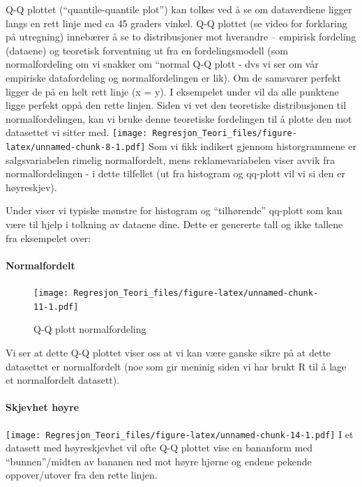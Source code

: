 \documentclass[
]{article}
\begin{document}
Q-Q plottet (``quantile-quantile plot'') kan tolkes ved å se om
dataverdiene ligger langs en rett linje med ca 45 graders vinkel. Q-Q
plottet (se video for forklaring på utregning) innebærer å se to
distribusjoner mot hverandre -- empirisk fordeling (dataene) og
teoretisk forventning ut fra en fordelingsmodell (som normalfordeling om
vi snakker om ``normal Q-Q plott - dvs vi ser om vår empiriske
datafordeling og normalfordelingen er lik). Om de samsvarer perfekt
ligger de på en helt rett linje (x = y). I eksempelet under vil da alle
punktene ligge perfekt oppå den rette linjen. Siden vi vet den
teoretiske distribusjonen til normalfordelingen, kan vi bruke denne
teoretiske fordelingen til å plotte den mot datasettet vi sitter med.
\texttt{[image: Regresjon\_Teori\_files/figure-latex/unnamed-chunk-8-1.pdf]}
Som vi fikk indikert gjennom historgrammene er salgsvariabelen rimelig
normalfordelt, mens reklamevariabelen viser avvik fra normalfordelingen
- i dette tilfellet (ut fra histogram og qq-plott vil vi si den er
høyreskjev).

Under viser vi typiske mønstre for histogram og ``tilhørende'' qq-plott
som kan være til hjelp i tolkning av dataene dine. Dette er genererte
tall og ikke tallene fra eksempelet over:

\hypertarget{normalfordelt}{%
\paragraph{Normalfordelt}\label{normalfordelt}}

\begin{figure}
\centering
\texttt{[image: Regresjon\_Teori\_files/figure-latex/unnamed-chunk-11-1.pdf]}
\caption{Q-Q plott normalfordeling}
\end{figure}

Vi ser at dette Q-Q plottet viser oss at vi kan være ganske sikre på at
dette datasettet er normalfordelt (noe som gir meninig siden vi har
brukt R til å lage et normalfordelt datasett).

\hypertarget{skjevhet-huxf8yre}{%
\paragraph{Skjevhet høyre}\label{skjevhet-huxf8yre}}

\texttt{[image: Regresjon\_Teori\_files/figure-latex/unnamed-chunk-14-1.pdf]}
I et datasett med høyreskjevhet vil ofte Q-Q plottet vise en bananform
med ``bunnen''/midten av bananen ned mot høyre hjørne og endene pekende
oppover/utover fra den rette linjen.
\end{document}
